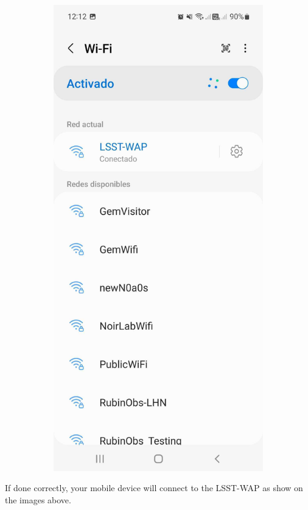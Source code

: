 \begin{figure}
\begin{subfigure}{0.40\textwidth}
    \end{subfigure}
      \hfill
    \begin{subfigure}{0.40\textwidth}
      \includegraphics[width=\textwidth]{Images/Android4.jpg}
    \end{subfigure}
  \end{figure}
  If done correctly, your mobile device will connect to the LSST-WAP as show on the images above. 
\newpage
